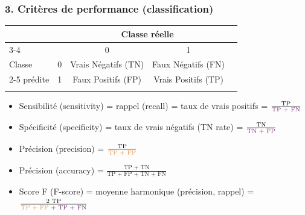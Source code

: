 \begin{frame}
  \frametitle{3. Critères de performance (classification)}
  \begin{center}
    {\small \begin{tabular}[h]{|lc|c|c|c|} \hline
      & & \multicolumn{2}{|c|}{Classe réelle} & \\ \cline{3-4}
      & & 0 & 1 & \\ \hline
      Classe & \multicolumn{1}{|c|}{0} & Vrais Négatifs (TN) & Faux Négatifs (FN) & {\color{MyOrange}{TN+FN}} \\ \cline{2-5}
      prédite & \multicolumn{1}{|c|}{1} & Faux Positifs (FP) & Vrais Positifs (TP) & {\color{MyOrange}{TP+FP}} \\ \hline
       &  & {\color{Aubergine}{TN + FP}} & {\color{Aubergine}{TP + FN}} & \\ \hline
    \end{tabular}}
  \end{center}

  \begin{itemize}
  \item Sensibilité \textcolor{gray!70}{(sensitivity)} = rappel \textcolor{gray!70}{(recall)} = taux de vrais positifs = $\frac{\text{TP}}{\color{Aubergine}{\text{TP + FN}}}$
  \item Spécificité \textcolor{gray!70}{(specificity)} = taux de vrais négatifs \textcolor{gray!70}{(TN rate)} = $\frac{\text{TN}}{\color{Aubergine}{\text{TN + FP}}}$
  \item Précision \textcolor{gray!70}{(precision)} = $\frac{\text{TP}}{\color{MyOrange}{\text{TP + FP}}}$
  \item Précision \textcolor{gray!70}{(accuracy)} = $\frac{\text{TP + TN}}{\text{TP + FP + TN + FN}}$
  \item Score F \textcolor{gray!70}{(F-score)} = moyenne harmonique (précision, rappel) = $\frac{\text{2 TP}}{\color{MyOrange}{\text{TP + FP}} {\color{MyDarkGrey}{\text{ + }}} \color{Aubergine}{\text{TP + FN}}}$
  \end{itemize}
\end{frame}

